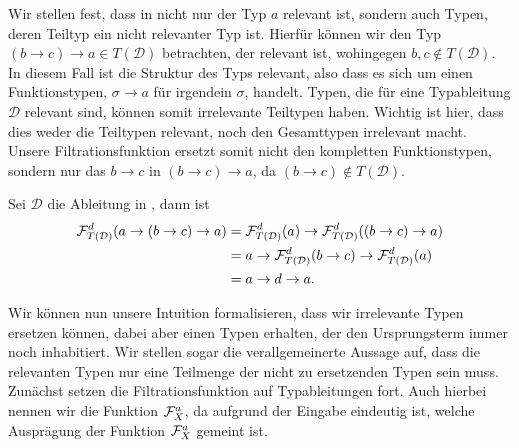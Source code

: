 Wir stellen fest, dass in  nicht nur der Typ $a$ relevant ist, sondern auch Typen, deren Teiltyp ein nicht relevanter Typ ist. Hierfür können wir den Typ $(b\to c)\to a\in T(\mathcal{D})$ betrachten, der relevant ist, wohingegen $b,c \notin T(\mathcal{D})$. In diesem Fall ist die Struktur des Typs relevant, also dass es sich um einen Funktionstypen, $\sigma\to a$ für irgendein $\sigma$, handelt. Typen, die für eine Typableitung $\mathcal{D}$ relevant sind, können somit irrelevante Teiltypen haben. Wichtig ist hier, dass dies weder die Teiltypen relevant, noch den Gesamttypen irrelevant macht. Unsere Filtrationsfunktion ersetzt somit nicht den kompletten Funktionstypen, sondern nur das $b\to c$ in $(b\to c)\to a$, da $(b\to c)\notin T(\mathcal{D})$.
\newcommand{\FCD}{\ensuremath{\F^d_{T(\mathcal{D})}}}
\begin{example}{}{}
    Sei $\mathcal{D}$ die Ableitung in , dann ist 
    \begin{align*}
    \FCD(a\to (b\to c) \to a) &= \FCD(a)\to\FCD((b\to c)\to a) \\
    & = a \to \FCD(b\to c)\to\FCD(a)\\ &=a\to d\to a.
    \end{align*}
\end{example}

Wir können nun unsere Intuition formalisieren, dass wir irrelevante Typen ersetzen können, dabei aber einen Typen erhalten, der den Ursprungsterm immer noch inhabitiert. Wir stellen sogar die verallgemeinerte Aussage auf, dass die relevanten Typen nur eine Teilmenge der nicht zu ersetzenden Typen sein muss. Zunächst setzen die Filtrationsfunktion auf Typableitungen fort. Auch hierbei nennen wir die Funktion $\mathcal{F}^a_X$, da aufgrund der Eingabe eindeutig ist, welche Ausprägung der Funktion $\mathcal{F}^a_X$ gemeint ist.

